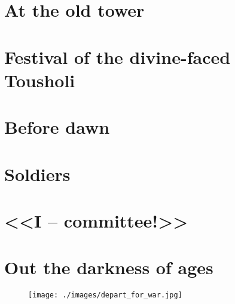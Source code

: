 \documentclass[smalldemyvopaper,11pt,twoside,onecolumn,openright,extrafontsizes]{memoir}
\begin{document}
\chapter{At the old tower}
\chapter{Festival of the divine-faced Tousholi}
\chapter{Before dawn}
\chapter{Soldiers}
\chapter{<<I -- committee!>>}
\chapter{Out the darkness of ages}

\pagestyle{empty}
\cleardoublepage
\begin{figure}
    \centering
    \texttt{[image: ./images/depart\_for\_war.jpg]}
    \label{fig:mountain_village}
\end{figure}
\end{document}
